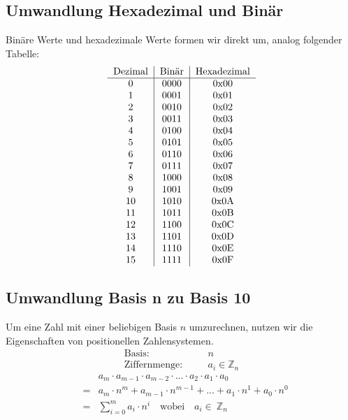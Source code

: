 \documentclass{report}
\begin{document}
\subsection{Umwandlung Hexadezimal und Binär}
Binäre Werte und hexadezimale Werte formen wir direkt um, analog folgender Tabelle:\begin{equation}\begin{tabular}{c | c | c}
Dezimal & Binär & Hexadezimal\\
\hline
0 & 0000 & 0x00\\
1 & 0001 & 0x01\\
2 & 0010 & 0x02\\
3 & 0011 & 0x03\\
4 & 0100 & 0x04\\
5 & 0101 & 0x05\\
6 & 0110 & 0x06\\
7 & 0111 & 0x07\\
8 & 1000 & 0x08\\
9 & 1001 & 0x09\\
10 & 1010 & 0x0A\\
11 & 1011 & 0x0B\\
12 & 1100 & 0x0C\\
13 & 1101 & 0x0D\\
14 & 1110 & 0x0E\\
15 & 1111 & 0x0F\\
\end{tabular}\end{equation}
\subsection{Umwandlung Basis n zu Basis 10}
Um eine Zahl mit einer beliebigen Basis $n$ umzurechnen, nutzen wir die Eigenschaften von positionellen Zahlensystemen.
\begin{eqnarray}\mbox{Basis}:&\quad& n \nonumber \\
\mbox{Ziffernmenge}:&\quad&a_i \in \mathbb{Z}_n\end{eqnarray}
\begin{eqnarray}&&a_m \cdot a_{m-1} \cdot a_{m-2} \cdot ... \cdot a_2 \cdot a_1 \cdot a_0 \nonumber \\
&=&a_m \cdot n^m + a_{m-1} \cdot n^{m-1} + ... + a_1 \cdot n^1 + a_0 \cdot n^0 \nonumber \\
&=&\sum_{i=0}^{m} a_i \cdot n^i \quad \mbox{wobei}\quad a_i \in\ \mathbb{Z}_n\end{eqnarray}
\end{document}

